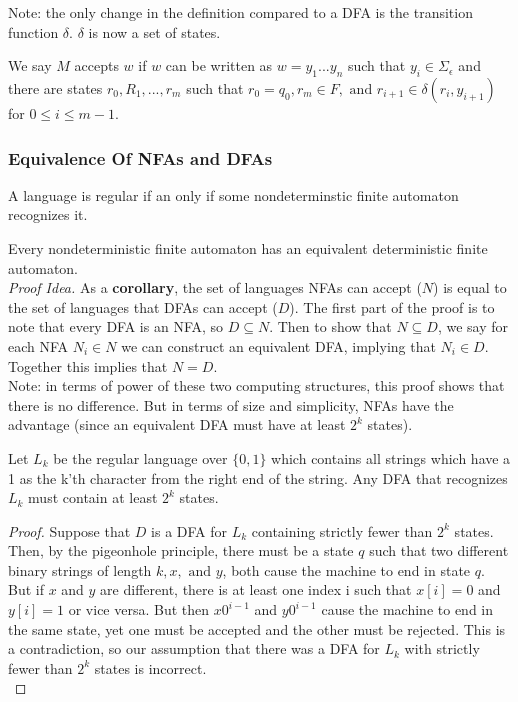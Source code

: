 \documentclass[11pt,a4paper]{article}
\begin{document}
Note: the only change in the definition compared to a DFA is the transition function $\delta$. $\delta$ is now a set of states.

We say $M$ accepts $w$ if $w$ can be written as $w=y_1...y_n$ such that $y_i\in\Sigma_{\epsilon}$ and there are states $r_0,R_1,...,r_m$ such that $r_0=q_0,r_m\in F,\text{ and }r_{i+1}\in\delta(r_i,y_{i+1})$ for $0\leq i\leq m - 1$.

\subsubsection{Equivalence Of NFAs and DFAs}
\begin{corollary}
    A language is regular if an only if some nondeterminstic finite automaton recognizes it.
\end{corollary}

\begin{theorem}
    Every nondeterministic finite automaton has an equivalent deterministic finite automaton. \\

    \textit{Proof Idea.} As a \textbf{corollary}, the set of languages NFAs can accept ($N$) is equal to the set of languages that DFAs can accept ($D$).
    The first part of the proof is to note that every DFA is an NFA, so $D\subseteq N$.
    Then to show that $N\subseteq D$, we say for each NFA $N_i\in N$ we can construct an equivalent DFA, implying that $N_i\in D$. Together this implies that $N=D$. \\

    Note: in terms of power of these two computing structures, this proof shows that there is no difference.
But in terms of size and simplicity, NFAs have the advantage (since an equivalent DFA must have at least $2^k$ states).
\end{theorem}

\begin{theorem}
    Let $L_k$ be the regular language over $\{0,1\}$ which contains all strings which have a 1 as the k'th character from the right end of the string.
    Any DFA that recognizes $L_k$ must contain at least $2^k$ states.

    \begin{proof}
        Suppose that $D$ is a DFA for $L_k$ containing strictly fewer than $2^k$ states. Then, by the pigeonhole principle, there must be a state $q$ such that two different binary strings of length $k,x,\text{ and }y$, both cause the machine to end in state $q$.
        But if $x$ and $y$ are different, there is at least one index i such that $x[i]=0$ and $y[i]=1$ or vice versa. But then $x0^{i-1}$ and $y0^{i-1}$ cause the machine to end in the same state, yet one must be accepted and the other must be rejected.
        This is a contradiction, so our assumption that there was a DFA for $L_k$ with strictly fewer than $2^k$ states is incorrect. \\
    \end{proof}
\end{theorem}
\end{document}
